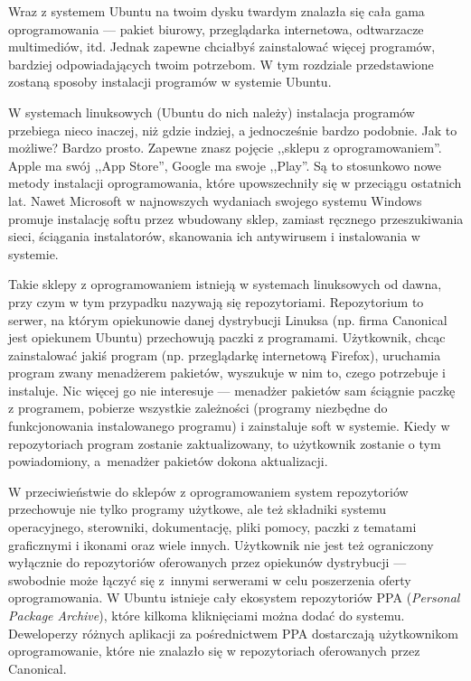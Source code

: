 Wraz z systemem Ubuntu na twoim dysku twardym znalazła się cała gama oprogramowania --- pakiet biurowy, przeglądarka internetowa, odtwarzacze multimediów, itd. Jednak zapewne chciałbyś zainstalować więcej programów, bardziej odpowiadających twoim potrzebom. W tym rozdziale przedstawione zostaną sposoby instalacji programów w systemie Ubuntu.

W systemach linuksowych (Ubuntu do nich należy) instalacja programów przebiega nieco inaczej, niż gdzie indziej, a jednocześnie bardzo podobnie. Jak to możliwe? Bardzo prosto. Zapewne znasz pojęcie ,,sklepu z oprogramowaniem''. Apple ma swój ,,App Store'', Google ma swoje ,,Play''. Są to stosunkowo nowe metody instalacji oprogramowania, które upowszechniły się w przeciągu ostatnich lat. Nawet Microsoft w najnowszych wydaniach swojego systemu Windows promuje instalację softu przez wbudowany sklep, zamiast ręcznego przeszukiwania sieci, ściągania instalatorów, skanowania ich antywirusem i instalowania w systemie.

Takie sklepy z oprogramowaniem istnieją w systemach linuksowych od dawna, przy czym w tym przypadku nazywają się \textcolor{ubuntu_orange}{repozytoriami}. Repozytorium to serwer, na którym opiekunowie danej dystrybucji Linuksa (np. firma Canonical jest opiekunem Ubuntu) przechowują paczki z programami. Użytkownik, chcąc zainstalować jakiś program (np. przeglądarkę internetową Firefox), uruchamia program zwany \textcolor{ubuntu_orange}{menadżerem pakietów}, wyszukuje w nim to, czego potrzebuje i instaluje. Nic więcej go nie interesuje --- menadżer pakietów sam ściągnie paczkę z programem, pobierze wszystkie zależności (programy niezbędne do funkcjonowania instalowanego programu) i zainstaluje soft w systemie. Kiedy w repozytoriach program zostanie zaktualizowany, to użytkownik zostanie o tym powiadomiony, a~menadżer pakietów dokona aktualizacji.

W przeciwieństwie do sklepów z oprogramowaniem system repozytoriów przechowuje nie tylko programy użytkowe, ale też składniki systemu operacyjnego, sterowniki, dokumentację, pliki pomocy, paczki z tematami graficznymi i ikonami oraz wiele innych. Użytkownik nie jest też ograniczony wyłącznie do repozytoriów oferowanych przez opiekunów dystrybucji --- swobodnie może łączyć się z~innymi serwerami w celu poszerzenia oferty oprogramowania. W Ubuntu istnieje cały ekosystem repozytoriów PPA (\textit{Personal Package Archive}), które kilkoma kliknięciami można dodać do systemu. Deweloperzy różnych aplikacji za pośrednictwem PPA dostarczają użytkownikom oprogramowanie, które nie znalazło się w repozytoriach oferowanych przez Canonical.

